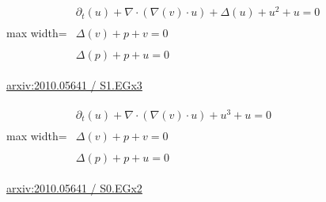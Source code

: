 \documentclass[UTF8,10pt,a4paper,fontset=mac]{ctexart}
\begin{document}
\begin{minipage}{\linewidth}\begin{center}\begin{adjustbox}{max width=\linewidth}$\displaystyle\begin{gathered}\begin{gathered}\partial_{t}(u)+\nabla\cdot(\nabla(v)\cdot u)+\Delta(u)+u^{2}+u=0\end{gathered}\\[5pt]\begin{gathered}\Delta(v)+p+v=0\end{gathered}\\[5pt]\begin{gathered}\Delta(p)+p+u=0\end{gathered}\end{gathered}$\end{adjustbox}\end{center}{\small\href{https://arxiv.org/html/2010.05641#S1.EGx3}{arxiv:2010.05641 / S1.EGx3}}\par\end{minipage}\par\vspace{6mm}

\begin{minipage}{\linewidth}\begin{center}\begin{adjustbox}{max width=\linewidth}$\displaystyle\begin{gathered}\begin{gathered}\partial_{t}(u)+\nabla\cdot(\nabla(v)\cdot u)+u^{3}+u=0\end{gathered}\\[5pt]\begin{gathered}\Delta(v)+p+v=0\end{gathered}\\[5pt]\begin{gathered}\Delta(p)+p+u=0\end{gathered}\end{gathered}$\end{adjustbox}\end{center}{\small\href{https://arxiv.org/html/2010.05641#S0.EGx2}{arxiv:2010.05641 / S0.EGx2}}\par\end{minipage}\par\vspace{6mm}
\end{document}
